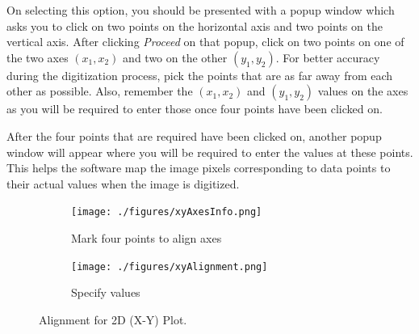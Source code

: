 \documentclass[letterpaper, 10pt]{article}
\begin{document}
On selecting this option, you should be presented with a popup window which asks you to click on two points on the horizontal axis and two points on the vertical axis. After clicking \emph{Proceed} on that popup, click on two points on one of the two axes $(x_1, x_2)$ and two on the other $(y_1, y_2)$. For better accuracy during the digitization process, pick the points that are as far away from each other as possible. Also, remember the $(x_1, x_2)$ and $(y_1, y_2)$ values on the axes as you will be required to enter those once four points have been clicked on.

After the four points that are required have been clicked on, another popup window will appear where you will be required to enter the values at these points. This helps the software map the image pixels corresponding to data points to their actual values when the image is digitized.

\begin{figure}
\centering
{\begin{subfigure}[b]{0.4\textwidth}
\texttt{[image: ./figures/xyAxesInfo.png]}
\caption{Mark four points to align axes}
\end{subfigure}
\begin{subfigure}[b]{0.4\textwidth}
\texttt{[image: ./figures/xyAlignment.png]}
\caption{Specify values}
\end{subfigure}}
\caption{Alignment for 2D (X-Y) Plot.}
\label{fig:xyAlignment}
\end{figure}
\end{document}
